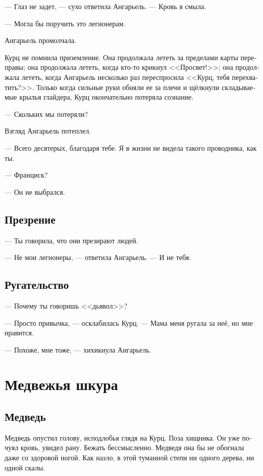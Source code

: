 \documentclass[a4paper,12pt,fleqn]{book}\usepackage{polyglossia}\setdefaultlanguage[babelshorthands=true]{russian}\setotherlanguage{english}\defaultfontfeatures{Ligatures=TeX,Mapping=tex-text}\usepackage{xcolor}\newcommand{\ml}[3]{#2}
\begin{document}
--- Глаз не задет, --- сухо ответила Ангарьель.
--- Кровь я смыла.

--- Могла бы поручить это легионерам.

Ангарьель промолчала.

Курц не помнила приземление.
Она продолжала лететь за пределами карты переправы;
она продолжала лететь, когда кто-то крикнул <<Просвет!>>;
она продолжала лететь, когда Ангарьель несколько раз переспросила <<Курц, тебя перехватить?>>.
Только когда сильные руки обняли ее за плечи и щёлкнули складываемые крылья глайдера, Курц окончательно потеряла сознание.

--- Скольких мы потеряли?

Взгляд Ангарьель потеплел.

--- Всего десятерых, благодаря тебе.
Я в жизни не видела такого проводника, как ты.

--- Франциск?

\ml{$0$}
{--- Он не выбрался.}
{``He didn't make it.''}

\section{Презрение}

--- Ты говорила, что они презирают людей.

--- Не мои легионеры, --- ответила Ангарьель.
--- И не тебя.

\section{Ругательство}

--- Почему ты говоришь <<дьявол>>?

--- Просто привычка, --- осклабилась Курц.
--- Мама меня ругала за неё, но мне нравится.

--- Похоже, мне тоже, --- хихикнула Ангарьель.

\chapter{Медвежья шкура}

\section{Медведь}

Медведь опустил голову, исподлобья глядя на Курц.
Поза хищника.
Он уже почуял кровь, увидел рану.
Бежать бессмысленно.
Медведя она бы не обогнала даже со здоровой ногой.
Как назло, в этой туманной степи ни одного дерева, ни одной скалы.
\end{document}
